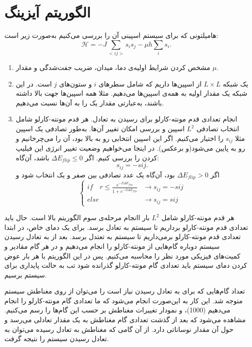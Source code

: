 \documentclass[a4paper,12pt]{article}
\begin{document}
\section{الگوریتم آیزینگ}
هامیلتونی که برای سیستم اسپینی آن را بررسی می‌کنیم
به‌صورت زیر است:
‌$$
\mathcal{H}=-J\sum_{<ij>}s_is_j -\mu h \sum_i s_i.
$$
\begin{enumerate}
 \item مشخص کردن شرایط اولیه‌ی دما، میدان، ضریب جفت‌شدگی و مقدار 
 $\mu$.
 \item یک شبکه 
 $L\times L$
 از اسپین‌ها داریم که شامل سطرهای
 $i$
 و ستون‌های
 $j$
است. در این شبکه یک مقدار اولیه به همه‌ی اسپین‌ها می‌دهیم.
مثلا همه اسپین‌ها جهت بالا داشته باشند، به‌عبارتی مقدار یک را به آن‌ها نسبت می‌دهیم.
 \item انجام تعدادی قدم مونته-کارلو برای رسیدن به تعادل.
 هر قدم مونته-کارلو شامل انتخاب تصادفی 
 $L^2$
اسپین و بررسی امکان تغییر آن‌ها.
 \subitem به‌طور تصادفی یک اسپین مثلا
 $s_{ij}$
 را اختیار می‌کنیم.
 \subitem اگر این اسپین انتخابی رو به بالا بود، آن را  می‌چرخانیم و
  رو به پایین می‌شود(و برعکس). در اینجا می‌خواهیم وضعیت تغییر انر‌ژی این
  فیلیپ کردن را بررسی کنیم.
 \subitem اگر 
 $\Delta E_{flip}\leq 0$
 باشد، آن‌گاه:
 $$
 s_{ij}=-s{ij}.
 $$
 \subitem اگر
 $\Delta E_{flip}>0$
 بود، آن‌گاه یک عدد تصادفی بین صفر و یک انتخاب شود و
 $$
 \begin{cases}
  if \quad r\leq \frac{e^{-\beta\Delta E_{flip}}}
  {1+e^{-\beta\Delta E_{flip}}} &\longrightarrow s_{ij}=-s{ij}\\
  else \quad &\longrightarrow s_{ij}=s{ij}
 \end{cases}
 $$
 
\end{enumerate}
هر قدم مونته-کارلو شامل
$L^2$
بار اانجام مرحله‌ی سوم الگوریتم بالا است.
حال باید تعدادی قدم مونته-کارلو برداریم تا سیستم به تعادل برسد.
برای یک دمای خاص، در ابتدا تعدادی قدم مونته-کارلو برمی‌داریم
تا سیستم  به تعتدل برسد. بعد از به تعادل رسیدن سیستم
دوباره گام‌هایی از مونته-کارلو را انجام می‌دهیم و در هر گام مقادیر
و کمیت‌های فیزیکی مورد نظر را محاسبه می‌کنیم.
پس در این الگوریتم با هر بار عوض کردن دمای سیستم باید تعدادی
گام مونته-کارلو گذرانده شود تب به حالت پایداری برای
سیستم برسیم.

تعداد گام‌هایی که برای به تعادل رسیدن نیاز است را می‌توان
از روی مغناطش سیستم متوجه شد.
این کار به  این‌صورت انجام می‌شود که
ما تعدادی گام مونته-کارلو را انجام می‌دهیم (1000)،
و نمودار تغییرات مغناطش بر حسب این گام‌ها را رسم می‌کنیم.
مشاهده می‌شود که بعد از گذشت
تعدادی گام مغناطش به یک مقدار تعادلی می‌رسد
و حول آن مقدار نوساناتی دارد.
از آن گامی که مغناطش به تعادل رسیده می‌توان
به تعادل رسیدن سیستم را نتیجه گرفت.
\end{document}

